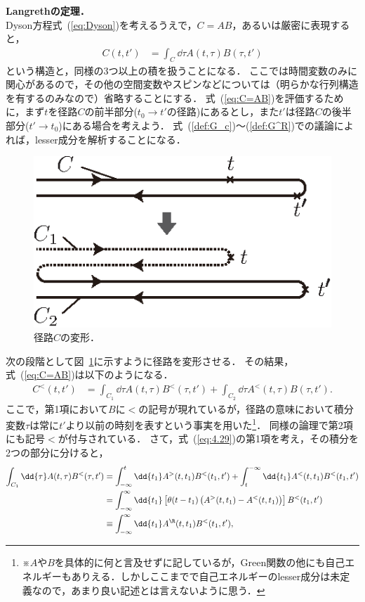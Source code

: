 \documentclass[a4paper,10pt]{jsarticle}
\begin{document}
\textbf{Langrethの定理．}\\
Dyson方程式~(\ref{eq:Dyson})を考えるうえで，$C = A B$，あるいは厳密に表現すると，
\begin{align}
C (t, t')
	& = \int_{C} \dd{\tau} A (t, \tau) B (\tau, t')
\label{eq:C=AB}
\end{align}
という構造と，同様の3つ以上の積を扱うことになる．
ここでは時間変数のみに関心があるので，その他の空間変数やスピンなどについては（明らかな行列構造を有するのみなので）省略することにする．
式~(\ref{eq:C=AB})を評価するために，まず$t$を径路$C$の前半部分($t_0 \to t'$の径路)にあるとし，また$t'$は径路$C$の後半部分($t' \to t_0$)にある場合を考えよう．
式~(\ref{def:G_c})〜(\ref{def:G^R})での議論によれば，lesser成分を解析することになる．

\begin{figure}[thbp]
\centering
\includegraphics[width=0.5\linewidth]{4.4.eps}
\caption{\label{fig:4.4}径路$C$の変形．}
\end{figure}
次の段階として図~\ref{fig:4.4}に示すように径路を変形させる．
その結果，式~(\ref{eq:C=AB})は以下のようになる．
\begin{align}
C^{<} (t, t')
	& = \int_{C_1} \dd{\tau} A (t, \tau) B^{<} (\tau, t')
		+ \int_{C_2} \dd{\tau} A^{<} (t, \tau) B (\tau, t')
\label{eq:4.29}
.\end{align}
ここで，第1項において$B$に$<$の記号が現れているが，径路の意味において積分変数$\tau$は常に$t'$より以前の時刻を表すという事実を用いた\footnote{※$A$や$B$を具体的に何と言及せずに記しているが，Green関数の他にも自己エネルギーもありえる．しかしここまでで自己エネルギーのlesser成分は未定義なので，あまり良い記述とは言えないように思う．}．
同様の論理で第2項にも記号$<$が付与されている．
さて，式~(\ref{eq:4.29})の第1項を考え，その積分を2つの部分に分けると，
\begin{align}
\int_{C_1} \dd{\tau} A (t, \tau) B^{<} (\tau, t')
	& = \int_{-\infty}^{t} \dd{t_1} A^{>} (t, t_1) B^{<} (t_1, t')
		+ \int_{t}^{-\infty} \dd{t_1} A^{<} (t, t_1) B^{<} (t_1, t')
\notag \\
	& = \int_{-\infty}^{\infty} \dd{t_1} \left[ \theta (t - t_1) \left( A^{>} (t, t_1) - A^{<} (t, t_1) \right) \right] B^{<} (t_1, t')
\notag \\
	& \equiv \int_{-\infty}^{\infty} \dd{t_1} A^{\R} (t, t_1) B^{<} (t_1, t')
,\end{align}
\end{document}

